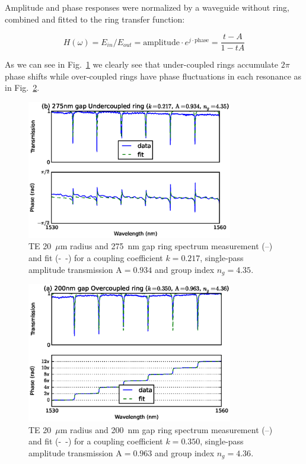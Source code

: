 \documentclass[journal]{IEEEtran}
\begin{document}
Amplitude and phase responses were normalized by a waveguide without ring, combined and fitted to the ring transfer function:

\begin{equation}
	H(\omega)=E_{in}/E_{out}=\mathrm{amplitude}\cdot e^{j\cdot \mathrm{phase}} = \frac{t-A}{1-tA}
\end{equation}
 

As we can see in Fig.~\ref{fig:undercoupled} we clearly see that under-coupled rings accumulate $2\pi$ phase shifts while over-coupled rings have phase fluctuations in each resonance as in Fig.~\ref{fig:overcoupled}. 

     
\begin{figure}[htb]
  \centerline{\includegraphics[width=9cm]{r20g275TE_fitPhaseAmp}}
  \caption{TE 20~$\mu$m radius and 275~nm gap ring spectrum measurement (--) and fit (-~-) for a coupling coefficient $k=0.217$, single-pass amplitude transmission $\mathrm{A=0.934}$ and group index $n_g=4.35$.}
  \label{fig:undercoupled} %
\end{figure}



\begin{figure}[htb]
  \centerline{\includegraphics[width=9cm]{r20g200TE_fitPhaseAmp}}
  \caption{TE 20~$\mu$m radius and 200~nm gap ring spectrum measurement (--) and fit (-~-) for a coupling coefficient $k=0.350$, single-pass amplitude transmission $\mathrm{A=0.963}$ and group index $n_g=4.36$.}
  \label{fig:overcoupled} %
\end{figure}
\end{document}
